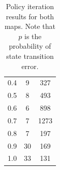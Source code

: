 \documentclass[11pt]{article}
\begin{document}
\begin{table}[h!]
\begin{minipage}{0.5\textwidth}
\begin{tabular}{@{}c|cc@{}}
        0.4          & 9       & 327                     \\
        0.5          & 8       & 493                     \\
        0.6          & 6       & 898                     \\
        0.7          & 7       & 1273                     \\
        0.8          & 7       & 197                     \\
        0.9          & 30       & 169                     \\
        1.0          & 33       & 131                     \\ \bottomrule
        \end{tabular}
    \end{minipage}
    \caption{Policy iteration results for both maps. Note that $p$ is the probability of state transition error.}\label{table:valueitertable}
\end{table}

\begin{figure}[h!]
    \begin{floatrow}
    \end{floatrow}
\end{figure}
\end{document}
